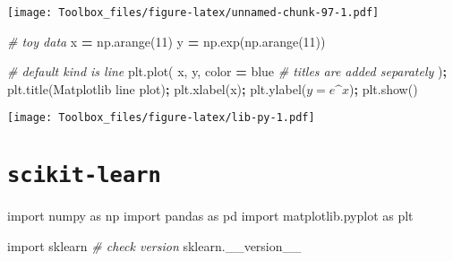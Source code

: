 \documentclass[
]{book}
\newenvironment{Shaded}{\begin{snugshade}}{\end{snugshade}}
\newcommand{\CommentTok}[1]{\textcolor[rgb]{0.56,0.35,0.01}{\textit{#1}}}
\newcommand{\DecValTok}[1]{\textcolor[rgb]{0.00,0.00,0.81}{#1}}
\newcommand{\ImportTok}[1]{#1}
\newcommand{\NormalTok}[1]{#1}
\newcommand{\OperatorTok}[1]{\textcolor[rgb]{0.81,0.36,0.00}{\textbf{#1}}}
\newcommand{\StringTok}[1]{\textcolor[rgb]{0.31,0.60,0.02}{#1}}
\begin{document}
\texttt{[image: Toolbox\_files/figure-latex/unnamed-chunk-97-1.pdf]}

\begin{Shaded}
\begin{Highlighting}[]
\CommentTok{\# toy data}
\NormalTok{x }\OperatorTok{=}\NormalTok{ np.arange(}\DecValTok{11}\NormalTok{)}
\NormalTok{y }\OperatorTok{=}\NormalTok{ np.exp(np.arange(}\DecValTok{11}\NormalTok{))}
\end{Highlighting}
\end{Shaded}

\begin{Shaded}
\begin{Highlighting}[]
\CommentTok{\# default \textquotesingle{}kind\textquotesingle{} is \textquotesingle{}line\textquotesingle{}}
\NormalTok{plt.plot(}
\NormalTok{  x, y,}
\NormalTok{  color }\OperatorTok{=} \StringTok{\textquotesingle{}blue\textquotesingle{}}
  \CommentTok{\# titles are added separately}
\NormalTok{)}\OperatorTok{;}
\NormalTok{plt.title(}\StringTok{\textquotesingle{}Matplotlib line plot\textquotesingle{}}\NormalTok{)}\OperatorTok{;}
\NormalTok{plt.xlabel(}\StringTok{\textquotesingle{}x\textquotesingle{}}\NormalTok{)}\OperatorTok{;}
\NormalTok{plt.ylabel(}\StringTok{\textquotesingle{}$y = e\^{}x$\textquotesingle{}}\NormalTok{)}\OperatorTok{;}
\NormalTok{plt.show()}
\end{Highlighting}
\end{Shaded}

\texttt{[image: Toolbox\_files/figure-latex/lib-py-1.pdf]}

\hypertarget{scikit-learn}{%
\chapter{\texorpdfstring{\texttt{scikit-learn}}{scikit-learn}}\label{scikit-learn}}

\begin{Shaded}
\begin{Highlighting}[]
\ImportTok{import}\NormalTok{ numpy }\ImportTok{as}\NormalTok{ np}
\ImportTok{import}\NormalTok{ pandas }\ImportTok{as}\NormalTok{ pd}
\ImportTok{import}\NormalTok{ matplotlib.pyplot }\ImportTok{as}\NormalTok{ plt}
\end{Highlighting}
\end{Shaded}

\begin{Shaded}
\begin{Highlighting}[]
\ImportTok{import}\NormalTok{ sklearn}
\CommentTok{\# check version}
\NormalTok{sklearn.\_\_version\_\_ }
\end{Highlighting}
\end{Shaded}
\end{document}
